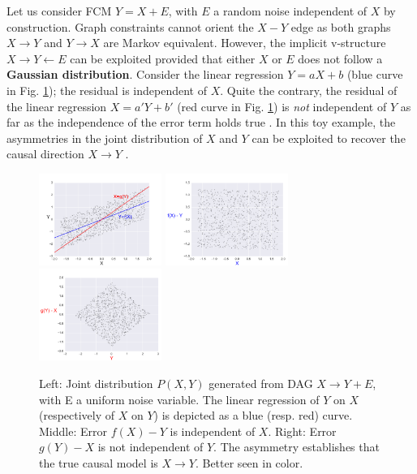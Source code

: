 \documentclass[a4paper, 11pt]{article}
\begin{document}
Let us consider FCM $Y = X + E$, with $E$ a random noise { independent} of $X$ by construction.  Graph constraints cannot orient the $X - Y$ edge as both graphs $X \rightarrow Y$ and $Y \rightarrow X$ are Markov equivalent. However, the implicit v-structure $X\rightarrow Y \leftarrow E$ can be exploited provided that either $X$ or $E$ does not follow a {\bf Gaussian distribution}. Consider the linear regression $Y = a X + b$ (blue curve in Fig. \ref{figure:parallelogram_example}); the residual is independent of $X$. Quite the contrary, the residual of the linear regression $X = a' Y + b'$ (red curve in Fig. \ref{figure:parallelogram_example}) is {\em not} independent of $Y$ as far as the independence of the error term holds true \citep{shimizu2006linear}. In this toy example, the asymmetries in the joint distribution of $X$ and $Y$ can be exploited to recover the causal direction $X \rightarrow Y$ \citep{spirtes2016causal}. 

 \begin{figure}[h!]
\begin{center}
\includegraphics[width=4cm]{parallelogram_example.pdf}
\includegraphics[width=4cm]{residual_X.pdf}
\includegraphics[width=4cm]{residual_Y.pdf}
\caption{Left: Joint distribution $P(X,Y)$ generated from DAG $X \rightarrow Y + E$, with E a uniform noise variable. The linear regression of $Y$ on $X$ (respectively of $X$ on $Y$) is depicted as a blue (resp. red) curve. Middle:  Error $f(X) - Y$ is independent of $X$. Right: Error $g(Y) - X$ is not independent of $Y$. The asymmetry establishes that the true causal model is $X \rightarrow Y$. Better seen in color.}
\label{figure:parallelogram_example}
\end{center}
\end{figure}
\end{document}
